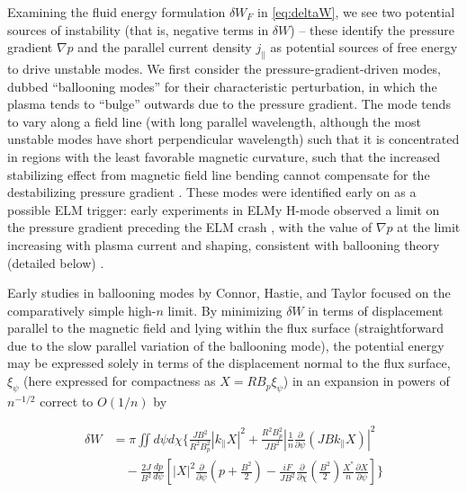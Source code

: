Examining the fluid energy formulation $\delta W_F$ in \cref{eq:deltaW}, we see two potential sources of instability (that is, negative terms in $\delta W$) -- these identify the pressure gradient $\nabla p$ and the parallel current density $j_\parallel$ as potential sources of free energy to drive unstable modes.  We first consider the pressure-gradient-driven modes, dubbed ``ballooning modes'' for their characteristic perturbation, in which the plasma tends to ``bulge'' outwards due to the pressure gradient.  The mode tends to vary along a field line (with long parallel wavelength, although the most unstable modes have short perpendicular wavelength) such that it is concentrated in regions with the least favorable magnetic curvature, such that the increased stabilizing effect from magnetic field line bending cannot compensate for the destabilizing pressure gradient \cite{Freidberg1987}.  These modes were identified early on as a possible ELM trigger: early experiments in ELMy H-mode observed a limit on the 
pressure gradient preceding the ELM crash \cite{Kamada1996,Suttrop2000}, with the value of $\nabla p$ at the limit increasing with plasma current and shaping, consistent with ballooning theory (detailed below) \cite{Suttrop2000a}.

Early studies in ballooning modes by Connor, Hastie, and Taylor \cite{Connor1978,Connor1979} focused on the comparatively simple high-$n$ limit.  By minimizing $\delta W$ in terms of displacement parallel to the magnetic field and lying within the flux surface (straightforward due to the slow parallel variation of the ballooning mode), the potential energy may be expressed solely in terms of the displacement normal to the flux surface, $\xi_\psi$ (here expressed for compactness as $X = RB_p \xi_\psi$) in an expansion in powers of $n^{-1/2}$ correct to $O(1/n)$ by

\begin{equation}\label{eq:dW_balloon}
 \begin{aligned}
  \delta W &= \pi \iint d\psi d\chi \Bigg\{ \frac{JB^2}{R^2 B_p^2} \left| k_\parallel X \right|^2 + \frac{R^2 B_p^2}{JB^2} \left| \frac{1}{n} \frac{\partial}{\partial \psi} \left( JB k_\parallel X \right) \right|^2\\
  &\quad- \frac{2J}{B^2} \frac{dp}{d\psi} \left[ \left| X \right|^2 \frac{\partial}{\partial \psi} \left( p + \frac{B^2}{2} \right) - \frac{iF}{JB^2} \frac{\partial}{\partial \chi} \left( \frac{B^2}{2} \right) \frac{X^*}{n} \frac{\partial X}{\partial \psi} \right] \Bigg\}
 \end{aligned}
\end{equation}

